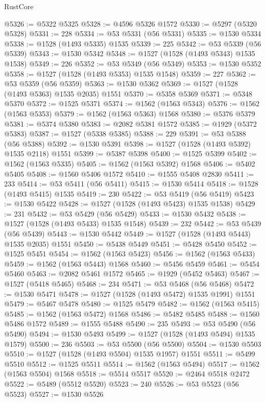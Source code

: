 \begin{lexlean}{RustCore}
\begin{coremodule}
@5326 := @5322 @5325
@5328 := @4596 @5326 @1572
@5330 := @5297 (@5320 @5328)
@5331 := 228
@5334 := @53 @5331 (@56 @5331)
@5335 := @1530 @5334
@5338 := @1528 (@1493 @5335) @1535
@5339 := 225
@5342 := @53 @5339 (@56 @5339)
@5343 := @1530 @5342
@5348 := @1527 (@1528 (@1493 @5343) @1535 @1538)
@5349 := 226
@5352 := @53 @5349 (@56 @5349)
@5353 := @1530 @5352
@5358 := @1527 (@1528 (@1493 @5353) @1535 @1548)
@5359 := 227
@5362 := @53 @5359 (@56 @5359)
@5363 := @1530 @5362
@5369 := @1527 (@1528 (@1493 @5363) @1535 @2035) @1551
@5370 := @5358 @5369
@5371 := @5348 @5370
@5372 := @1525 @5371
@5374 := @1562 (@1563 @5343)
@5376 := @1562 (@1563 @5353)
@5379 := @1562 (@1563 @5363) @1568
@5380 := @5376 @5379
@5381 := @5374 @5380
@5383 := @2082 @5381 @1572
@5385 := @1929 (@5372 @5383)
@5387 := @1527 (@5338 @5385)
@5388 := 229
@5391 := @53 @5388 (@56 @5388)
@5392 := @1530 @5391
@5398 := @1527 (@1528 (@1493 @5392) @1535 @2118) @1551
@5399 := @5387 @5398
@5400 := @1525 @5399
@5402 := @1562 (@1563 @5335)
@5405 := @1562 (@1563 @5392) @1568
@5406 := @5402 @5405
@5408 := @1560 @5406 @1572
@5410 := @1555 @5408 @2830
@5411 := 233
@5414 := @53 @5411 (@56 @5411)
@5415 := @1530 @5414
@5418 := @1528 (@1493 @5415) @1535
@5419 := 230
@5422 := @53 @5419 (@56 @5419)
@5423 := @1530 @5422
@5428 := @1527 (@1528 (@1493 @5423) @1535 @1538)
@5429 := 231
@5432 := @53 @5429 (@56 @5429)
@5433 := @1530 @5432
@5438 := @1527 (@1528 (@1493 @5433) @1535 @1548)
@5439 := 232
@5442 := @53 @5439 (@56 @5439)
@5443 := @1530 @5442
@5449 := @1527 (@1528 (@1493 @5443) @1535 @2035) @1551
@5450 := @5438 @5449
@5451 := @5428 @5450
@5452 := @1525 @5451
@5454 := @1562 (@1563 @5423)
@5456 := @1562 (@1563 @5433)
@5459 := @1562 (@1563 @5443) @1568
@5460 := @5456 @5459
@5461 := @5454 @5460
@5463 := @2082 @5461 @1572
@5465 := @1929 (@5452 @5463)
@5467 := @1527 (@5418 @5465)
@5468 := 234
@5471 := @53 @5468 (@56 @5468)
@5472 := @1530 @5471
@5478 := @1527 (@1528 (@1493 @5472) @1535 @1991) @1551
@5479 := @5467 @5478
@5480 := @1525 @5479
@5482 := @1562 (@1563 @5415)
@5485 := @1562 (@1563 @5472) @1568
@5486 := @5482 @5485
@5488 := @1560 @5486 @1572
@5489 := @1555 @5488
@5490 := 235
@5493 := @53 @5490 (@56 @5490)
@5494 := @1530 @5493
@5499 := @1527 (@1528 (@1493 @5494) @1535 @1579)
@5500 := 236
@5503 := @53 @5500 (@56 @5500)
@5504 := @1530 @5503
@5510 := @1527 (@1528 (@1493 @5504) @1535 @1957) @1551
@5511 := @5499 @5510
@5512 := @1525 @5511
@5514 := @1562 (@1563 @5494)
@5517 := @1562 (@1563 @5504) @1568
@5518 := @5514 @5517
@5520 := @2464 @5518 @2472
@5522 := @5489 (@5512 @5520)
@5523 := 240
@5526 := @53 @5523 (@56 @5523)
@5527 := @1530 @5526

\end{coremodule}
\end{lexlean}
